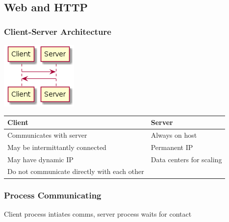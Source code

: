 \documentclass[11pt]{article}
\begin{document}
\subsection{Web and HTTP}
\label{sec:org9f19fd2}
\subsubsection{Client-Server Architecture}
\label{sec:orgcd362ae}

\begin{center}
\includegraphics[width=.9\linewidth]{clientserver.png}
\end{center}

\begin{center}
\begin{tabular}{ll}
\textbf{Client} & \textbf{Server}\\
\hline
Communicates with server & Always on host\\
\hline
May be intermittantly connected & Permanent IP\\
\hline
May have dynamic IP & Data centers for scaling\\
\hline
Do not communicate directly with each other & \\
\end{tabular}
\end{center}

\subsubsection{Process Communicating}
\label{sec:orgaa13e88}
Client process intiates comms, server process waits for contact
\end{document}
